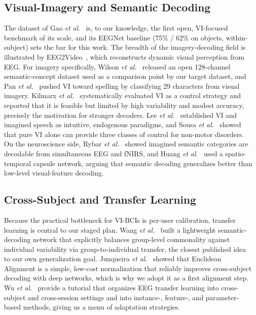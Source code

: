 \documentclass[conference]{IEEEtran}
\begin{document}
\subsection{Visual-Imagery and Semantic Decoding}
The dataset of Gao \textit{et al.}~\cite{gao2026} is, to our knowledge, the
first open, VI-focused benchmark of its scale, and its EEGNet baseline
(75\% / 62\% on objects, within-subject) sets the bar for this work. The
breadth of the imagery-decoding field is illustrated by
EEG2Video~\cite{eeg2video2024}, which reconstructs dynamic visual perception
from EEG. For imagery specifically, Wilson \textit{et al.}~\cite{wilson2023}
released an open 128-channel semantic-concept dataset used as a comparison
point by our target dataset, and Pan \textit{et al.}~\cite{pan2024} pushed VI
toward spelling by classifying 29 characters from visual imagery. Kilmarx
\textit{et al.}~\cite{kilmarx2024} systematically evaluated VI as a control
strategy and reported that it is feasible but limited by high variability and
modest accuracy, precisely the motivation for stronger decoders. Lee
\textit{et al.}~\cite{lee2020} established VI and imagined speech as
intuitive, endogenous paradigms, and Sousa \textit{et al.}~\cite{sousa2017}
showed that pure VI alone can provide three classes of control for non-motor
disorders. On the neuroscience side, Rybar \textit{et al.}~\cite{rybar2025}
showed imagined semantic categories are decodable from simultaneous EEG and
fNIRS, and Huang \textit{et al.}~\cite{huang2024} used a spatio-temporal
capsule network, arguing that semantic decoding generalizes better than
low-level visual-feature decoding.

\subsection{Cross-Subject and Transfer Learning}
Because the practical bottleneck for VI-BCIs is per-user calibration,
transfer learning is central to our staged plan. Wang
\textit{et al.}~\cite{wang_group2025} built a lightweight semantic-decoding
network that explicitly balances group-level commonality against individual
variability via group-to-individual transfer, the closest published idea to
our own generalization goal. Junqueira \textit{et al.}~\cite{junqueira2024}
showed that Euclidean Alignment is a simple, low-cost normalization that
reliably improves cross-subject decoding with deep networks, which is why we
adopt it as a first alignment step. Wu \textit{et al.}~\cite{wu2022} provide
a tutorial that organizes EEG transfer learning into cross-subject and
cross-session settings and into instance-, feature-, and parameter-based
methods, giving us a menu of adaptation strategies.
\end{document}
